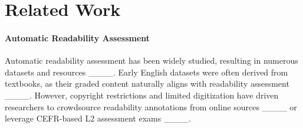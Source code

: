 \section{Related Work}
\label{sec:related}






  




 
\paragraph{Automatic Readability Assessment}
Automatic readability assessment has been widely studied, resulting in numerous datasets and resources ____. Early English datasets were often derived from textbooks, as their graded content naturally aligns with readability assessment ____. However, copyright restrictions and limited digitization have driven researchers to crowdsource readability annotations from online sources ____ or leverage CEFR-based L2 assessment exams ____.
 

